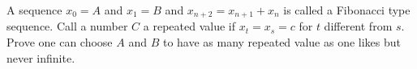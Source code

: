 A sequence $x_0=A$ and $x_1=B$ and $x_{n+2}=x_{n+1} +x_n$ is called a Fibonacci type sequence. Call a number $C$ a repeated value if $x_t=x_s=c$ for $t$ different from $s$.
Prove one can choose $A$ and $B$ to have as many repeated value as one likes but never infinite.